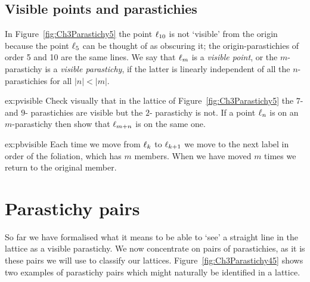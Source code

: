 \subsection{Visible points and parastichies}
In Figure~\ref{fig:Ch3Parastichy5} the point $\ell_{{10}}$ is not `visible' from the origin because the point $\ell_{{5}}$ can be thought of as obscuring it; the 
origin-parastichies of order 5 and 10 are the same lines. 
We say that $\ell_{{m}}$ is a \emph{visible point}, or the $m$-parastichy is a \emph{visible parastichy}, if the latter is linearly independent of all the $n$-parastichies for all $|n|<|m|$. 
\begin{jExercise}{ex:pvisible}
	Check  visually that in the lattice of Figure~\ref{fig:Ch3Parastichy5} the $7$- and $9$- parastichies are visible but the $2$- parastichy is not.
If a point $\ell_{{n}}$ is on an $m$-parastichy then show that $\ell_{{m+n}}$ is on the same one.
\label{ex:bb}
\end{jExercise}
\begin{jAnswer}{ex:pbvisible}
	Each time we move from $\ell_{{k}}$ to $\ell_{{k+1}}$ we move to the next label in order of the foliation, which has $m$ members. When we have moved $m$ times we return to the original member.
\end{jAnswer}




\clearpage
\section{Parastichy pairs}

So far we have formalised what it means to be able to `see' a straight line in the lattice as a visible parastichy. 
We now concentrate on pairs of parastichies, as it is these pairs we will use to classify our lattices. Figure~\ref{fig:Ch3Parastichy45} shows two examples of parastichy pairs which might naturally be identified in a lattice. 






